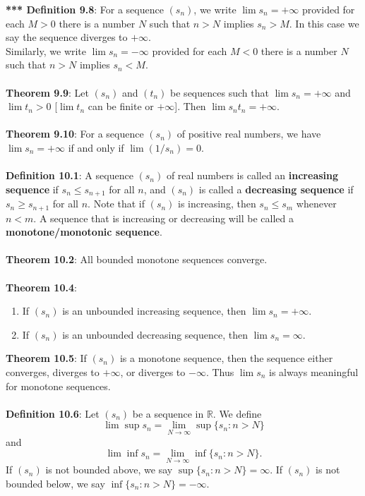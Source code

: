 \documentclass{article}
\theoremstyle{definition}
\DeclareMathOperator{\Inf}{inf}
\DeclareMathOperator{\Sup}{sup}
\begin{document}
\textbf{*** Definition 9.8}: For a sequence $(s_n)$, we write $\lim s_n = +\infty$ provided for each $M > 0$ there is a number $N$ such that $n > N$ implies $s_n > M$. In this case we say the sequence diverges to $+\infty$. \\
Similarly, we write $\lim s_n = -\infty$ provided
for each $M < 0$ there is a number $N$ such that
$n > N$ implies $s_n < M$. \\ \\
\textbf{Theorem 9.9}: Let $(s_n)$ and $(t_n)$ be sequences such that $\lim s_n = +\infty$ and $\lim t_n > 0$ [$\lim t_n$ can be finite or $+\infty$]. Then $\lim s_nt_n = +\infty$. \\ \\
\textbf{Theorem 9.10}: For a sequence $(s_n)$ of positive real numbers, we have $\lim s_n = +\infty$ if and only if $\lim(1/s_n) = 0$. \\ \\
\textbf{Definition 10.1}: A sequence $(s_n)$ of real numbers is called an \textbf{increasing sequence} if $s_n \leq s_{n + 1}$ for all $n$, and $(s_n)$ is called a \textbf{decreasing sequence} if $s_n \geq s_{n + 1}$ for all $n$. Note that if $(s_n)$ is increasing, then $s_n \leq s_m$ whenever $n < m$. A sequence that is increasing or decreasing will be called a \textbf{monotone/monotonic sequence}. \\ \\
\textbf{Theorem 10.2}: All bounded monotone sequences converge. \\ \\
\textbf{Theorem 10.4}: \begin{enumerate}
    \item If $(s_n)$ is an unbounded increasing sequence, then $\lim s_n = +\infty$.
    \item If $(s_n)$ is an unbounded decreasing sequence, then $\lim s_n = \infty$.
\end{enumerate} $ $ \\
\textbf{Theorem 10.5}: If $(s_n)$ is a monotone sequence, then the sequence either converges, diverges to $+\infty$, or diverges to $-\infty$. Thus $\lim s_n$ is always meaningful for monotone sequences. \\ \\
\textbf{Definition 10.6}: Let $(s_n)$ be a sequence in $\mathbb{R}$. We define $$\lim{\Sup{s_n}} = \lim_{N \rightarrow \infty}{\Sup\{s_n : n > N\}}$$ and $$\lim{\Inf{s_n}} = \lim_{N \rightarrow \infty}{\Inf\{s_n : n > N\}}.$$ If $(s_n)$ is not bounded above, we say $\Sup\{s_n : n > N\} = \infty$. If $(s_n)$ is not bounded below, we say $\Inf\{s_n : n > N\} = -\infty$. \\ \\
\end{document}
